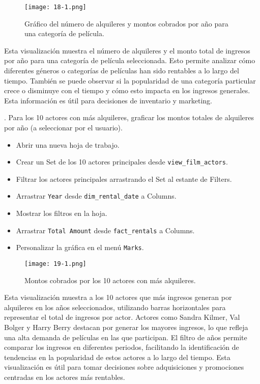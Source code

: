 \documentclass{article}
\begin{document}
\begin{figure}[h]
    \centering
    \texttt{[image: 18-1.png]} %
    \caption{Gráfico del número de alquileres y montos cobrados por año para una categoría de película.}
    \label{fig:alquileres-categoria}
\end{figure}

Esta visualización muestra el número de alquileres y el monto total de ingresos por año para una categoría de película seleccionada. Esto permite analizar cómo diferentes géneros o categorías de películas han sido rentables a lo largo del tiempo. También se puede observar si la popularidad de una categoría particular crece o disminuye con el tiempo y cómo esto impacta en los ingresos generales. Esta información es útil para decisiones de inventario y marketing.

. Para los 10 actores con más alquileres, graficar los montos totales de alquileres por año (a seleccionar por el usuario).

\begin{itemize}
    \item Abrir una nueva hoja de trabajo.
    \item Crear un Set de los 10 actores principales desde \texttt{view\_film\_actors}.
    \item Filtrar los actores principales arrastrando el Set al estante de Filters.
    \item Arrastrar \texttt{Year} desde \texttt{dim\_rental\_date} a Columns.
    \item Mostrar los filtros en la hoja.
    \item Arrastrar \texttt{Total Amount} desde \texttt{fact\_rentals} a Columns.
    \item Personalizar la gráfica en el menú \texttt{Marks}.
\end{itemize}

\begin{figure}[h]
    \centering
    \texttt{[image: 19-1.png]} %
    \caption{Montos cobrados por los 10 actores con más alquileres.}
    \label{fig:alquileres-actores}
\end{figure}

Esta visualización muestra a los 10 actores que más ingresos generan por alquileres en los años seleccionados, utilizando barras horizontales para representar el total de ingresos por actor. Actores como Sandra Kilmer, Val Bolger y Harry Berry destacan por generar los mayores ingresos, lo que refleja una alta demanda de películas en las que participan. El filtro de años permite comparar los ingresos en diferentes periodos, facilitando la identificación de tendencias en la popularidad de estos actores a lo largo del tiempo. Esta visualización es útil para tomar decisiones sobre adquisiciones y promociones centradas en los actores más rentables.
\end{document}
